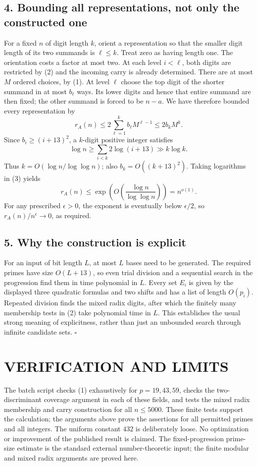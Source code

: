 \subsection{4. Bounding all representations, not only the constructed one}
For a fixed $n$ of digit length $k$, orient a representation so that
the smaller digit length of its two summands is $\ell\leq k$.
Treat zero as having length one. The orientation costs a factor at
most two. At each level $i<\ell$, both digits are restricted by (2)
and the incoming carry is already determined. There are at most $M$
ordered choices, by (1). At level $\ell$ choose the top digit of the
shorter summand in at most $b_\ell$ ways. Its lower digits and hence
that entire summand are then fixed; the other summand is forced to
be $n-a$. We have therefore bounded every representation by
\[
 r_A(n)\leq2\sum_{\ell=1}^k b_\ell M^{\ell-1}
 \leq2b_k M^k.                                      \tag{3}
\]
Since $b_i\geq(i+13)^2$, a $k$-digit positive integer satisfies
\[
 \log n\geq\sum_{i<k}2\log(i+13)\gg k\log k.
\]
Thus $k=O(\log n/\log\log n)$; also $b_k=O((k+13)^2)$.
Taking logarithms in (3) yields
\[
 r_A(n)\leq\exp\!\left(O\!\left(\frac{\log n}{\log\log n}\right)\right)
 =n^{o(1)}.
\]
For any prescribed $\epsilon>0$, the exponent is eventually below
$\epsilon/2$, so $r_A(n)/n^\epsilon\to0$, as required.

\subsection{5. Why the construction is explicit}
For an input of bit length $L$, at most $L$ bases need to be generated.
The required primes have size $O(L+13)$, so even trial division and a
sequential search in the progression find them in time polynomial in
$L$. Every set $E_i$ is given by the displayed three quadratic formulas
and two shifts and has a list of length $O(p_i)$. Repeated division
finds the mixed radix digits, after which the finitely many membership
tests in (2) take polynomial time in $L$. This establishes the usual
strong meaning of explicitness, rather than just an unbounded search
through infinite candidate sets. \hfill$\square$

\section{VERIFICATION AND LIMITS}
The batch script checks (1) exhaustively for $p=19,43,59$, checks the
two-discriminant coverage argument in each of these fields, and tests
the mixed radix membership and carry construction for all $n\leq5000$.
These finite tests support the calculation; the arguments above prove
the assertions for all permitted primes and all integers.
The uniform constant $432$ is deliberately loose. No optimization or
improvement of the published result is claimed. The fixed-progression
prime-size estimate is the standard external number-theoretic input;
the finite modular and mixed radix arguments are proved here.

